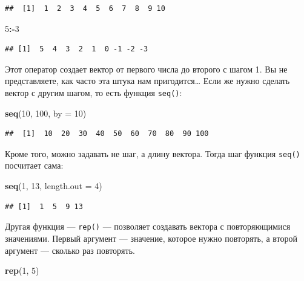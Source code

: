 \documentclass[
]{book}
\newenvironment{Shaded}{\begin{snugshade}}{\end{snugshade}}
\newcommand{\DataTypeTok}[1]{\textcolor[rgb]{0.13,0.29,0.53}{#1}}
\newcommand{\DecValTok}[1]{\textcolor[rgb]{0.00,0.00,0.81}{#1}}
\newcommand{\KeywordTok}[1]{\textcolor[rgb]{0.13,0.29,0.53}{\textbf{#1}}}
\newcommand{\NormalTok}[1]{#1}
\newcommand{\OperatorTok}[1]{\textcolor[rgb]{0.81,0.36,0.00}{\textbf{#1}}}
\begin{document}
\begin{verbatim}
##  [1]  1  2  3  4  5  6  7  8  9 10
\end{verbatim}

\begin{Shaded}
\begin{Highlighting}[]
\DecValTok{5}\OperatorTok{:-}\DecValTok{3}
\end{Highlighting}
\end{Shaded}

\begin{verbatim}
## [1]  5  4  3  2  1  0 -1 -2 -3
\end{verbatim}

Этот оператор создает вектор от первого числа до второго с шагом 1. Вы не представляете, как часто эта штука нам пригодится\ldots{} Если же нужно сделать вектор с другим шагом, то есть функция \texttt{seq()}:

\begin{Shaded}
\begin{Highlighting}[]
\KeywordTok{seq}\NormalTok{(}\DecValTok{10}\NormalTok{, }\DecValTok{100}\NormalTok{, }\DataTypeTok{by =} \DecValTok{10}\NormalTok{)}
\end{Highlighting}
\end{Shaded}

\begin{verbatim}
##  [1]  10  20  30  40  50  60  70  80  90 100
\end{verbatim}

Кроме того, можно задавать не шаг, а длину вектора. Тогда шаг функция \texttt{seq()} посчитает сама:

\begin{Shaded}
\begin{Highlighting}[]
\KeywordTok{seq}\NormalTok{(}\DecValTok{1}\NormalTok{, }\DecValTok{13}\NormalTok{, }\DataTypeTok{length.out =} \DecValTok{4}\NormalTok{)}
\end{Highlighting}
\end{Shaded}

\begin{verbatim}
## [1]  1  5  9 13
\end{verbatim}

Другая функция --- \texttt{rep()} --- позволяет создавать вектора с повторяющимися значениями. Первый аргумент --- значение, которое нужно повторять, а второй аргумент --- сколько раз повторять.

\begin{Shaded}
\begin{Highlighting}[]
\KeywordTok{rep}\NormalTok{(}\DecValTok{1}\NormalTok{, }\DecValTok{5}\NormalTok{)}
\end{Highlighting}
\end{Shaded}
\end{document}

